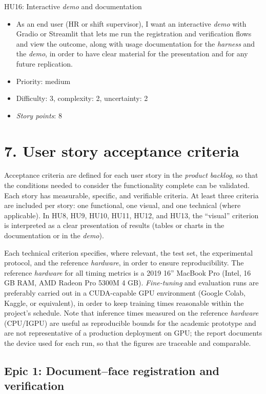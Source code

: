 \documentclass[
  11pt, %
]{charter}
\begin{document}
HU16: Interactive \textit{demo} and documentation
\begin{itemize}
  \item As an end user (HR or shift supervisor), I want an interactive \textit{demo} with Gradio or Streamlit that lets me run the registration and verification flows and view the outcome, along with usage documentation for the \textit{harness} and the \textit{demo}, in order to have clear material for the presentation and for any future replication.
  \item Priority: medium
  \item Difficulty: 3, complexity: 2, uncertainty: 2
  \item \textit{Story points}: 8
\end{itemize}

\section{7. User story acceptance criteria}
\label{sec:criteriosAceptacion}

Acceptance criteria are defined for each user story in the \textit{product backlog}, so that the conditions needed to consider the functionality complete can be validated. Each story has measurable, specific, and verifiable criteria. At least three criteria are included per story: one functional, one visual, and one technical (where applicable). In HU8, HU9, HU10, HU11, HU12, and HU13, the ``visual'' criterion is interpreted as a clear presentation of results (tables or charts in the documentation or in the \textit{demo}).

Each technical criterion specifies, where relevant, the test set, the experimental protocol, and the reference \textit{hardware}, in order to ensure reproducibility. The reference \textit{hardware} for all timing metrics is a 2019 16'' MacBook Pro (Intel, 16 GB RAM, AMD Radeon Pro 5300M 4 GB). \textit{Fine-tuning} and evaluation runs are preferably carried out in a CUDA-capable GPU environment (Google Colab, Kaggle, or equivalent), in order to keep training times reasonable within the project's schedule. Note that inference times measured on the reference \textit{hardware} (CPU/IGPU) are useful as reproducible bounds for the academic prototype and are not representative of a production deployment on GPU; the report documents the device used for each run, so that the figures are traceable and comparable.

\subsection{Epic 1: Document--face registration and verification}
\end{document}
